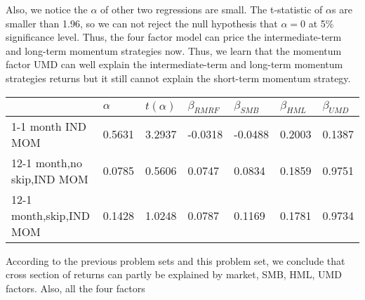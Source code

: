 \documentclass{report}
\begin{document}
Also, we notice the $\alpha$ of other two regressions are small. The t-statistic of $\alpha$s are smaller than 1.96, so we can not reject the null hypothesis that $\alpha = 0$ at 5\% significance level. Thus, the four factor model can price the intermediate-term and long-term momentum strategies now. Thus, we learn that the momentum factor UMD can well explain the intermediate-term and long-term momentum strategies returns but it still cannot explain the short-term momentum strategy.
\begin{table}[H]
\centering
\begin{tabular}{|l|l|l|l|l|l|l|}
\hline
                           & $\alpha$  & $t(\alpha)$ & $\beta_{RMRF}$    & $\beta_{SMB}$     & $\beta_{HML}$ & $\beta_{UMD}$   \\ \hline
1-1 month IND MOM          & 0.5631 & 3.2937 & -0.0318 & -0.0488 & 0.2003 & 0.1387 \\ \hline
12-1 month,no skip,IND MOM & 0.0785 & 0.5606 & 0.0747  & 0.0834  & 0.1859 & 0.9751 \\ \hline
12-1 month,skip,IND MOM    & 0.1428 & 1.0248 & 0.0787  & 0.1169  & 0.1781 & 0.9734 \\ \hline
\end{tabular}
\end{table}

According to the previous problem sets and this problem set, we conclude that cross section of returns can partly be explained by market, SMB, HML, UMD factors.  Also, all the four factors
\end{document}
